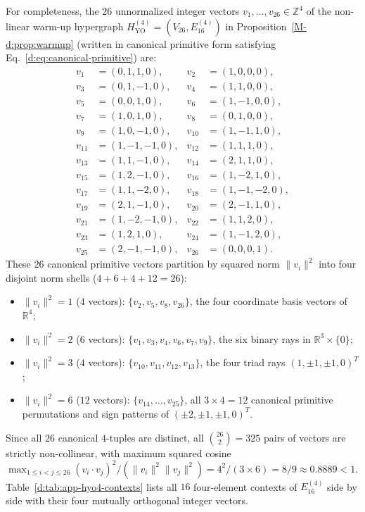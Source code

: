\documentclass[aps,pra,reprint,superscriptaddress,longbibliography,nofootinbib,floatfix,10pt]{revtex4-2}
\theoremstyle{definition}
\newcommand{\R}{\mathbb{R}}
\newcommand{\YO}{\mathrm{YO}}
\begin{document}
For completeness, the $26$ unnormalized integer vectors $v_1,\ldots,v_{26}\in\mathbb{Z}^4$ of the non-linear warm-up hypergraph $H_{\YO}^{(4)}=(V_{26},E_{16}^{(4)})$ in Proposition~\ref{M-d:prop:warmup} (written in canonical primitive form satisfying Eq.~\eqref{d:eq:canonical-primitive}) are:
\begin{equation}\label{d:eq:hyo4-vectors}
\begin{aligned}
v_1&=(0,1,1,0),& v_2&=(1,0,0,0),\\
v_3&=(0,1,-1,0),& v_4&=(1,1,0,0),\\
v_5&=(0,0,1,0),& v_6&=(1,-1,0,0),\\
v_7&=(1,0,1,0),& v_8&=(0,1,0,0),\\
v_9&=(1,0,-1,0),& v_{10}&=(1,-1,1,0),\\
v_{11}&=(1,-1,-1,0),& v_{12}&=(1,1,1,0),\\
v_{13}&=(1,1,-1,0),& v_{14}&=(2,1,1,0),\\
v_{15}&=(1,2,-1,0),& v_{16}&=(1,-2,1,0),\\
v_{17}&=(1,1,-2,0),& v_{18}&=(1,-1,-2,0),\\
v_{19}&=(2,1,-1,0),& v_{20}&=(2,-1,1,0),\\
v_{21}&=(1,-2,-1,0),& v_{22}&=(1,1,2,0),\\
v_{23}&=(1,2,1,0),& v_{24}&=(1,-1,2,0),\\
v_{25}&=(2,-1,-1,0),& v_{26}&=(0,0,0,1).
\end{aligned}
\end{equation}
These $26$ canonical primitive vectors partition by squared norm $\|v_i\|^2$ into four disjoint norm shells ($4+6+4+12=26$):
\begin{itemize}
\item $\|v_i\|^2=1$ ($4$ vectors): $\{v_2,v_5,v_8,v_{26}\}$, the four coordinate basis vectors of $\R^4$;
\item $\|v_i\|^2=2$ ($6$ vectors): $\{v_1,v_3,v_4,v_6,v_7,v_9\}$, the six binary rays in $\R^3\times\{0\}$;
\item $\|v_i\|^2=3$ ($4$ vectors): $\{v_{10},v_{11},v_{12},v_{13}\}$, the four triad rays $(1,\pm1,\pm1,0)^T$;
\item $\|v_i\|^2=6$ ($12$ vectors): $\{v_{14},\ldots,v_{25}\}$, all $3\times 4=12$ canonical primitive permutations and sign patterns of $(\pm2,\pm1,\pm1,0)^T$.
\end{itemize}
Since all $26$ canonical $4$-tuples are distinct, all $\binom{26}{2}=325$ pairs of vectors are strictly non-collinear, with maximum squared cosine $\max_{1\le i<j\le 26}(v_i\cdot v_j)^2/(\|v_i\|^2\|v_j\|^2)=4^2/(3\times 6)=8/9\approx 0.8889<1$. Table~\ref{d:tab:app-hyo4-contexts} lists all $16$ four-element contexts of $E_{16}^{(4)}$ side by side with their four mutually orthogonal integer vectors.
\end{document}
